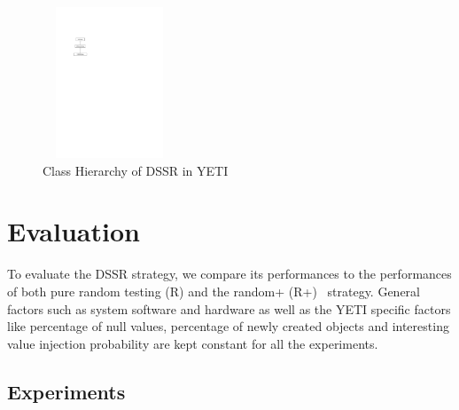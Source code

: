 \documentclass[conference]{IEEEtran}
\begin{document}
\begin{figure}[h]
\centering
\includegraphics[width=4cm,height=4.5cm]{hierarchy.pdf}
\caption{Class Hierarchy of DSSR in YETI}
\label{fig:hierarchyofDSSR}
\end{figure}







\section{Evaluation}\label{sec:eval}

To evaluate the DSSR strategy, we compare its performances to the performances of both pure random testing (R) and the random+ (R+)~\cite{Oriol2010} strategy. General factors such as system software and hardware as well as the YETI specific factors like percentage of null values, percentage of newly created objects and interesting value injection probability are kept constant for all the experiments.\\
\subsection{Experiments}
\end{document}
